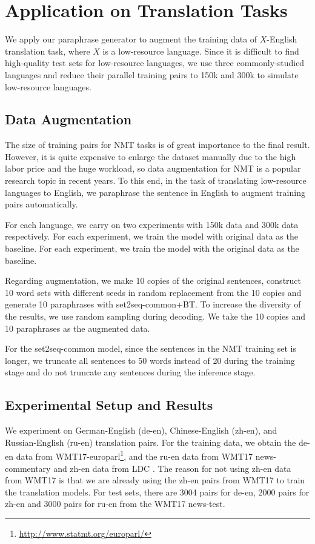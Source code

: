 \section{Application on Translation Tasks} \label{sec:app}
We apply our paraphrase generator to augment the training data of $X$-English 
translation task, where $X$ is a low-resource language. 
Since it is difficult to find high-quality test sets for low-resource 
languages, we use three commonly-studied languages and reduce their 
parallel training pairs to 150k and 300k to simulate low-resource languages. 

\subsection{Data Augmentation}
The size of training pairs for NMT tasks is of great importance to the final result. However, it is quite expensive to enlarge the dataset manually due to the high labor price and the huge workload, so data augmentation for NMT is a popular research topic in recent years. To this end, in the task of translating low-resource languages to English, we paraphrase the sentence in English to augment training pairs automatically.

For each language, we carry on two experiments with 150k data and 300k data respectively. For each experiment, we train the model with original data 
as the baseline. 
For each experiment, we train the model with the original
data as the baseline.

Regarding augmentation, we make 10 copies of the original sentences, 
construct 10 word sets with different seeds in random replacement from the 10 copies and generate 10 paraphrases 
with set2seq-common+BT.
To increase the diversity of the results, 
we use random sampling \cite{edunov2018understanding} during decoding. 
We take the 10 copies and 10 paraphrases as the augmented data.

For the set2seq-common model, since the sentences 
in the NMT training set is longer, we truncate all sentences 
to 50 words instead of 20 during the training stage and 
do not truncate any sentences during the inference stage.

\subsection{Experimental Setup and Results}
We experiment on German-English (de-en), Chinese-English (zh-en), and Russian-English (ru-en) translation pairs. For the training data, 
we obtain the de-en data from WMT17-europarl\footnote{\url{http://www.statmt.org/europarl/}}\cite{koehn2005europarl}, and the ru-en data from WMT17 news-commentary and zh-en data from LDC \cite{liberman2002emotional,huang2002multiple}. The reason for not using zh-en data from WMT17 is that we are already using the zh-en pairs from WMT17 to train 
the translation models.
For test sets, there are 3004 pairs for de-en, 2000 pairs for zh-en and 
3000 pairs for ru-en from the WMT17 news-test.

